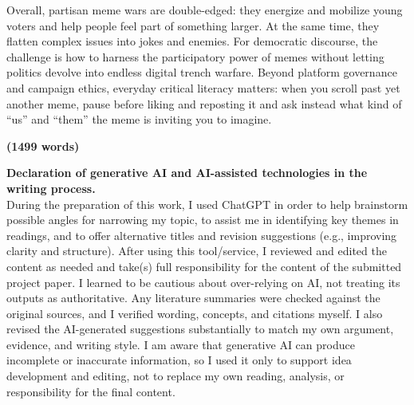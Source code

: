 \documentclass[12pt,twoside]{article}
\begin{document}

Overall, partisan meme wars are double-edged: they energize and mobilize young voters and help people feel part of something larger. At the same time, they flatten complex issues into jokes and enemies. For democratic discourse, the challenge is how to harness the participatory power of memes without letting politics devolve into endless digital trench warfare. Beyond platform governance and campaign ethics, everyday critical literacy matters: when you scroll past yet another meme, pause before liking and reposting it and ask instead what kind of ``us'' and ``them'' the meme is inviting you to imagine.


\vspace{-\baselineskip}

\begin{flushright}\textbf{(1499 words)}\end{flushright}

\vspace{-\baselineskip}

\textbf{Declaration of generative AI and AI-assisted technologies in the writing process.}\\
During the preparation of this work, I used ChatGPT in order to help brainstorm possible angles for narrowing my topic, to assist me in identifying key themes in readings, and to offer alternative titles and revision suggestions (e.g., improving clarity and structure). After using this tool/service, I reviewed and edited the content as needed and take(s) full responsibility for the content of the submitted project paper.
I learned to be cautious about over-relying on AI, not treating its outputs as authoritative. Any literature summaries were checked against the original sources, and I verified wording, concepts, and citations myself. I also revised the AI-generated suggestions substantially to match my own argument, evidence, and writing style. I am aware that generative AI can produce incomplete or inaccurate information, so I used it only to support idea development and editing, not to replace my own reading, analysis, or responsibility for the final content.

\vspace{\baselineskip}

\printbibliography[heading=normalrefs,title={References}]
\end{document}
